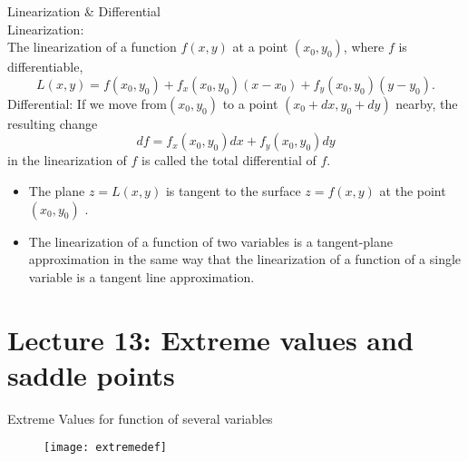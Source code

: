 \documentclass[10pt]{beamer}
\begin{document}
\begin{frame}[allowframebreaks]{Linearization \& Differential}
~\\
{\color{blue} Linearization}:\\
The {\color{red}linearization} of a function $f (x, y)$ at a point $(x_0, y_0)$, where $f$ is differentiable,
$$L(x,y) = f(x_0,y_0) + f_x(x_0,y_0)(x-x_0) + f_y(x_0,y_0)(y-y_0).$$
$$$$$$$${\color{blue}Differential}:
If we move from$ (x_0, y_0)$ to a point $(x_0 +dx, y_0 +dy)$ nearby, the resulting change
$$df = f_x(x_0,y_0)dx + f_y(x_0,y_0)dy$$
in the linearization of $f$ is called the  {\color{red}total differential} of $f$.

\newpage
\begin{itemize}
	\item The plane $z = L(x, y)$ is tangent to the surface $z = f (x, y)$ at the point $(x_0, y_0)$		.
	\item The linearization of a function of two variables is a {\color{red}tangent-plane approximation}
	in the same way that the linearization of a function of a single variable is a
	{\color{blue}tangent line approximation}.
\end{itemize}

\end{frame}



















\section{Lecture 13: Extreme values and saddle points}

\begin{frame}[allowframebreaks]{Extreme Values for function of several variables}
	\begin{figure}[H]
		\centering
		\texttt{[image: extremedef]}
	\end{figure}

\end{frame}
\end{document}
